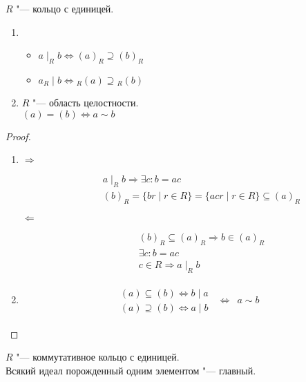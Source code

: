 \begin{exmp}
	$R$ "--- кольцо с единицей.
	\begin{enumerate}
	\item
		\begin{itemize}
			\item $a \mid _{R} b \iff \left(a\right)_{R} \supseteq \left(b\right)_{R}$
			\item $a {}_{R} \mid b \iff {}_{R}\left(a\right) \supseteq {}_{R}\left(b\right)$
		\end{itemize}
	\item
		$R$ "--- область целостности. \\
			$\left(a\right) = \left(b\right) \iff a \sim b$
	\end{enumerate}
	\begin{proof}
		\begin{enumerate}
			\item 
			\begin{description}
				\item[$\Rightarrow$] 			
				\begin{gather*}
					a \mid_{R} b \Rightarrow \exists c \colon b=ac \\
					\left(b\right)_{R} = \{br \mid r \in R\} = \{acr \mid r \in R\} \subseteq \left(a\right)_{R} 
				\end{gather*}
				\item[$\Leftarrow$] 
				\begin{gather*}
					\left(b\right)_{R} \subseteq \left(a\right)_{R} \Rightarrow b \in \left(a\right)_{R} \\
					\exists c \colon b = ac \\
					c \in R \Rightarrow a \mid_{R} b
				\end{gather*}
			\end{description}
			\item
				\[
				\begin{array}{rcl}
					\begin{array}{l}
						\left(a\right) \subseteq \left(b\right) \iff b \mid a\\
						\left(a\right) \supseteq \left(b\right) \iff a \mid b
					\end{array}
					& \iff & a \sim b
				\end{array}
				\]
		\end{enumerate}
	\end{proof}
\end{exmp}

\begin{Def}
	$R$ "--- коммутативное кольцо с единицей.\\
	Всякий идеал порожденный одним элементом "--- главный.
\end{Def}

